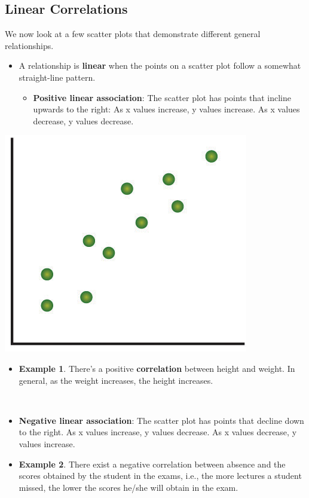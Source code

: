 \documentclass[
]{book}
\providecommand{\tightlist}{%
  \setlength{\itemsep}{0pt}\setlength{\parskip}{0pt}}
\begin{document}
\hypertarget{linear-correlations}{%
\subsection{Linear Correlations}\label{linear-correlations}}

We now look at a few scatter plots that demonstrate different general relationships.

\begin{itemize}
\item
  A relationship is \textbf{linear} when the points on a scatter plot follow a somewhat straight-line pattern.

  \begin{itemize}
  \tightlist
  \item
    \textbf{Positive linear association}: The scatter plot has points that incline upwards to the right: As x values increase, y values increase. As x values decrease, y values decrease.
  \end{itemize}
\end{itemize}

\hfill\break

\begin{center}\includegraphics[width=0.5\linewidth]{week12/linearPos} \end{center}

\begin{itemize}
\tightlist
\item
  \textbf{Example 1}. There's a positive \textbf{correlation} between height and weight. In general, as the weight increases, the height increases.
\end{itemize}

~

\begin{itemize}
\item
  \textbf{Negative linear association}: The scatter plot has points that decline down to the right. As x values increase, y values decrease. As x values decrease, y values increase.\\
\item
  \textbf{Example 2}. There exist a negative correlation between absence and the scores obtained by the student in the exams, i.e., the more lectures a student missed, the lower the scores he/she will obtain in the exam.
\end{itemize}
\end{document}
